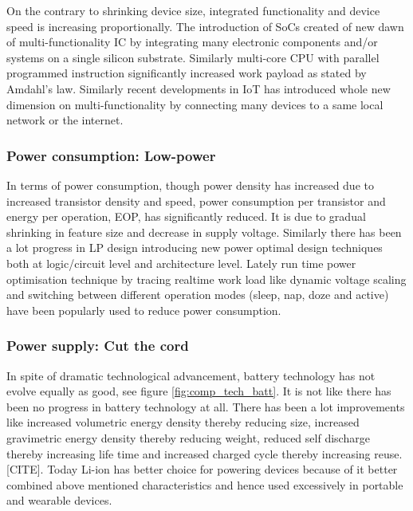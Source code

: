 \documentclass[12pt,a4paper,UKenglish]{article}
\begin{document}
On the contrary to shrinking device size, integrated functionality and device speed is increasing proportionally. 
The introduction of SoCs created of new dawn of multi-functionality IC by integrating many electronic components 
and/or systems on a single silicon substrate. Similarly multi-core CPU with parallel programmed instruction  
significantly increased work payload as stated by Amdahl's law. Similarly recent developments in IoT has 
introduced whole new dimension on multi-functionality by connecting many devices to a same local network or 
the internet\cite{iot_intro}. \\

\subsubsection{Power consumption: Low-power}

In terms of power consumption, though power density has increased due to increased transistor density and speed, 
power consumption per transistor and energy per operation, EOP, has significantly reduced. It is due to gradual 
shrinking in feature size and decrease in supply voltage. Similarly there has been a lot progress in LP design 
introducing new power optimal design techniques both at logic/circuit level and architecture level. Lately run 
time power optimisation technique by tracing realtime work load like dynamic voltage scaling and switching 
between different operation modes (sleep, nap, doze and active) have been popularly used to reduce power 
consumption\cite{rabaey_2009}. \\


\subsubsection{Power supply: Cut the cord}

In spite of dramatic technological advancement, battery technology has not evolve equally as good, see figure 
\ref{fig:comp_tech_batt}. It is not like there has been no progress in battery technology at all. There has been a lot improvements 
like increased volumetric energy density thereby reducing size, increased gravimetric energy density thereby 
reducing weight, reduced self discharge thereby increasing life time and increased charged cycle thereby 
increasing reuse.[CITE]. Today Li-ion has better choice for powering devices because of it better combined 
above mentioned characteristics and hence used excessively in portable and wearable devices. \\
\end{document}
